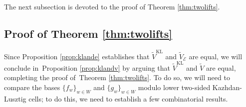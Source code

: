 \documentclass{amsart}
\theoremstyle{definition}
\begin{document}
The next subsection is devoted to the proof of Theorem \ref{thm:twolifts}.

\subsection{Proof of Theorem \ref{thm:twolifts}}

Since Proposition \ref{prop:klande} establishes that $\tilde{V}^{\mathrm{KL}}$ and $\tilde{V}_{\mathcal{E}}$ are equal, we will conclude in~Proposition \ref{prop:klandv} by arguing that $\tilde{V}^{\mathrm{KL}}$ and $\tilde{V}$ are equal, completing the proof of~Theorem \ref{thm:twolifts}. To do so, we will need to compare the bases $\{f_w\}_{w \in W}$ and $\{g_w\}_{w \in W}$ modulo lower two-sided Kazhdan-Lusztig cells; to do this, we need to establish a few combinatorial results.
\end{document}
